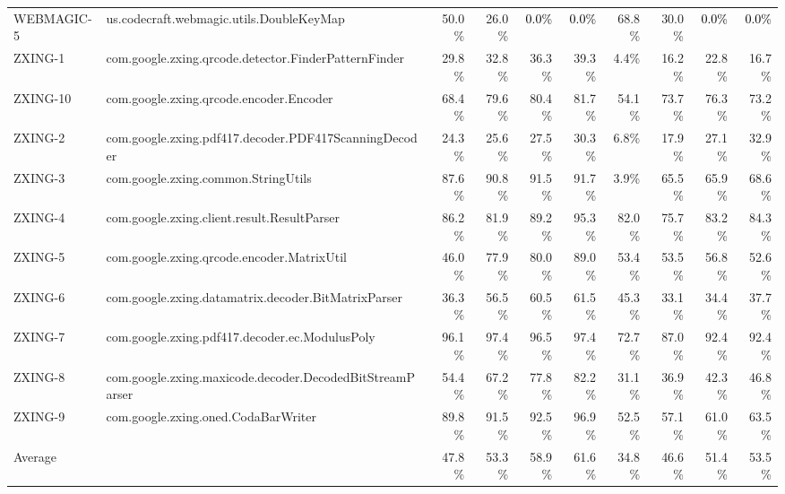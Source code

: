 \begin{tabular}{ ll rrrr rrrr}
WEBMAGIC-5  &  us.codecraft.webmagic.utils.DoubleKeyMap & 50.0\% & 26.0\% & \cellcolor{light-gray} \textcolor{black}{0.0\%} & \cellcolor{light-gray} \textcolor{black}{0.0\%} & 68.8\% & 30.0\% & \cellcolor{light-gray} \textcolor{black}{0.0\%} & \cellcolor{light-gray} \textcolor{black}{0.0\%}\\ 
ZXING-1  &  com.google.zxing.qrcode.detector.FinderPatternFinder & 29.8\% & 32.8\% & 36.3\% & 39.3\% & 4.4\% & 16.2\% & 22.8\% & 16.7\%\\ 
ZXING-10  &  com.google.zxing.qrcode.encoder.Encoder & 68.4\% & 79.6\% & 80.4\% & 81.7\% & 54.1\% & 73.7\% & 76.3\% & 73.2\%\\ 
ZXING-2  &  com.google.zxing.pdf417.decoder.PDF417ScanningDecoder & 24.3\% & 25.6\% & 27.5\% & 30.3\% & 6.8\% & 17.9\% & 27.1\% & 32.9\%\\ 
ZXING-3  &  com.google.zxing.common.StringUtils & 87.6\% & 90.8\% & 91.5\% & 91.7\% & 3.9\% & 65.5\% & 65.9\% & 68.6\%\\ 
ZXING-4  &  com.google.zxing.client.result.ResultParser & 86.2\% & 81.9\% & 89.2\% & 95.3\% & 82.0\% & 75.7\% & 83.2\% & 84.3\%\\ 
ZXING-5  &  com.google.zxing.qrcode.encoder.MatrixUtil & 46.0\% & 77.9\% & 80.0\% & 89.0\% & 53.4\% & 53.5\% & 56.8\% & 52.6\%\\ 
ZXING-6  &  com.google.zxing.datamatrix.decoder.BitMatrixParser & 36.3\% & 56.5\% & 60.5\% & 61.5\% & 45.3\% & 33.1\% & 34.4\% & 37.7\%\\ 
ZXING-7  &  com.google.zxing.pdf417.decoder.ec.ModulusPoly & 96.1\% & 97.4\% & 96.5\% & 97.4\% & 72.7\% & 87.0\% & 92.4\% & 92.4\%\\ 
ZXING-8  &  com.google.zxing.maxicode.decoder.DecodedBitStreamParser & 54.4\% & 67.2\% & 77.8\% & 82.2\% & 31.1\% & 36.9\% & 42.3\% & 46.8\%\\ 
ZXING-9  &  com.google.zxing.oned.CodaBarWriter & 89.8\% & 91.5\% & 92.5\% & 96.9\% & 52.5\% & 57.1\% & 61.0\% & 63.5\%\\ 
\midrule 
Average &  &  47.8\% &  53.3\% &  58.9\% &  61.6\% &  34.8\% &  46.6\% &  51.4\% &  53.5\%\\ 
\bottomrule 
\end{tabular} 
